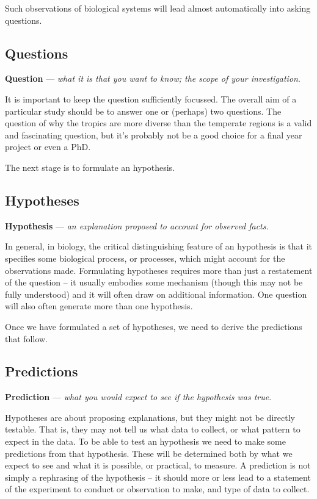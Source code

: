 \documentclass[
]{book}
\begin{document}
Such observations of biological systems will lead almost automatically into asking questions.

\hypertarget{stages-questions}{%
\subsection{Questions}\label{stages-questions}}

\textbf{Question} --- \emph{what it is that you want to know; the scope of your investigation}.

It is important to keep the question sufficiently focussed. The overall aim of a particular study should be to answer one or (perhaps) two questions. The question of why the tropics are more diverse than the temperate regions is a valid and fascinating question, but it's probably not be a good choice for a final year project or even a PhD.

The next stage is to formulate an hypothesis.

\hypertarget{stages-hypotheses}{%
\subsection{Hypotheses}\label{stages-hypotheses}}

\textbf{Hypothesis} --- \emph{an explanation proposed to account for observed facts.}

In general, in biology, the critical distinguishing feature of an hypothesis is that it specifies some biological process, or processes, which might account for the observations made. Formulating hypotheses requires more than just a restatement of the question -- it usually embodies some mechanism (though this may not be fully understood) and it will often draw on additional information. One question will also often generate more than one hypothesis.

Once we have formulated a set of hypotheses, we need to derive the predictions that follow.

\hypertarget{stages-predictions}{%
\subsection{Predictions}\label{stages-predictions}}

\textbf{Prediction} --- \emph{what you would expect to see if the hypothesis was true}.

Hypotheses are about proposing explanations, but they might not be directly testable. That is, they may not tell us what data to collect, or what pattern to expect in the data. To be able to test an hypothesis we need to make some predictions from that hypothesis. These will be determined both by what we expect to see and what it is possible, or practical, to measure. A prediction is not simply a rephrasing of the hypothesis -- it should more or less lead to a statement of the experiment to conduct or observation to make, and type of data to collect.
\end{document}
